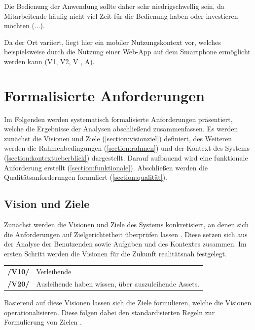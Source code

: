 Die Bedienung der Anwendung sollte daher sehr niedrigschwellig sein, da Mitarbeitende häufig nicht
viel Zeit für die Bedienung haben oder investieren möchten (...).

Da der Ort variiert, liegt hier ein mobiler Nutzungskontext vor, welches beispielsweise durch die
Nutzung einer Web-App auf dem Smartphone ermöglicht werden kann (V1, V2, V , A).



\section{Formalisierte Anforderungen}
\label{section:anforderung}

Im Folgenden werden systematisch formalisierte Anforderungen präsentiert, welche die Ergebnisse der
Analysen abschließend zusammenfassen. Es werden zunächst die Visionen und Ziele
(\ref{section:visionziel}) definiert, des Weiteren werden die Rahmenbedingungen
(\ref{section:rahmen}) und der Kontext des Systems (\ref{section:kontextueberblick}) dargestellt.
Darauf aufbauend wird eine funktionale Anforderung erstellt (\ref{section:funktionale}). Abschließen
werden die Qualitätsanforderungen formuliert (\ref{section:qualität}).


\subsection*{Vision und Ziele}
\label{section:visionziel}
Zunächst werden die Visionen und Ziele des Systems konkretisiert, an denen sich die Anforderungen
auf Zielgerichtetheit überprüfen lassen \cite{balzert2009}. Diese setzen sich aus der Analyse der
Benutzenden sowie Aufgaben und des Kontextes zusammen. Im ersten Schritt werden die Visionen für die
Zukunft realitätsnah festgelegt.



\begin{center}
        \renewcommand{\arraystretch}{1.5}
        \begin{tabular}{p{}p{}}
                \hline
                \textbf{/V10/} & Verleihende \\
                \textbf{/V20/} & Ausleihende haben wissen, über auszuleihende Assets.
                \\
                \hline
        \end{tabular}
\end{center}

Basierend auf diese Visionen lassen sich die Ziele formulieren, welche die Visionen
operationalisieren. Diese folgen dabei den standardisierten Regeln zur Formulierung von Zielen
\cite{pohl_requirements_2008}.


